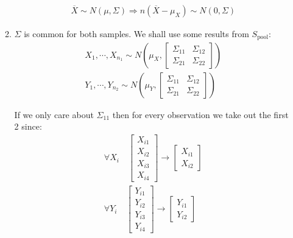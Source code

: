 \begin{enumerate}[label=\arabic*., leftmargin=*]
\begin{enumerate}[label=\alph*),leftmargin=*]
\begin{equation*}
\begin{gathered}
          \overline{X}\sim N(\mu,\Sigma) \Rightarrow n(\overline{X}-\mu_X)\sim N(0,\Sigma)
        \end{gathered}
      \end{equation*}
      \par\bigskip
    \item $\Sigma$ is common for both samples. We shall use some results from $S_{\text{pool}}$:
      \begin{equation*}
        \begin{gathered}
          X_1,\cdots,X_{n_1}\sim N\left(\mu_X,\begin{bmatrix}\Sigma_{11}&\Sigma_{12}\\\Sigma_{21}&\Sigma_{22}\end{bmatrix}\right)\\
          Y_1,\cdots,Y_{n_2}\sim N\left(\mu_Y,\begin{bmatrix}\Sigma_{11}&\Sigma_{12}\\\Sigma_{21}&\Sigma_{22}\end{bmatrix}\right)
        \end{gathered}
      \end{equation*}
      \par\bigskip
      \noindent If we only care about $\Sigma_{11}$ then for every observation we take out the first 2 since:
      \begin{equation*}
        \begin{gathered}
          \forall X_i\quad \begin{bmatrix}X_{i1}\\X_{i2}\\X_{i3}\\X_{i4}\end{bmatrix}\rightarrow \begin{bmatrix}X_{i1}\\X_{i2}\end{bmatrix}\\
          \forall Y_i\quad \begin{bmatrix}Y_{i1}\\Y_{i2}\\Y_{i3}\\Y_{i4}\end{bmatrix}\rightarrow \begin{bmatrix}Y_{i1}\\Y_{i2}\end{bmatrix}
        \end{gathered}
      \end{equation*}
      \par\bigskip

\end{enumerate}
\end{enumerate}
